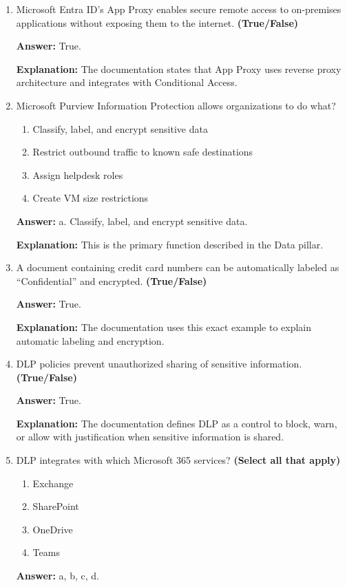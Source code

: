 \documentclass[10pt]{article}
\begin{document}
\begin{enumerate}[leftmargin=*]
\textbf{Explanation:} The Applications section explicitly identifies Defender for Cloud Apps as the tool for shadow IT visibility and control.

\item Microsoft Entra ID’s App Proxy enables secure remote access to on-premises applications without exposing them to the internet. \textbf{(True/False)}

\textbf{Answer:} True.

\textbf{Explanation:} The documentation states that App Proxy uses reverse proxy architecture and integrates with Conditional Access.

\item Microsoft Purview Information Protection allows organizations to do what?
\begin{enumerate}[label=\alph*., leftmargin=1.5em]
\item Classify, label, and encrypt sensitive data
\item Restrict outbound traffic to known safe destinations
\item Assign helpdesk roles
\item Create VM size restrictions
\end{enumerate}
\textbf{Answer:} a. Classify, label, and encrypt sensitive data.

\textbf{Explanation:} This is the primary function described in the Data pillar.

\item A document containing credit card numbers can be automatically labeled as ``Confidential'' and encrypted. \textbf{(True/False)}

\textbf{Answer:} True.

\textbf{Explanation:} The documentation uses this exact example to explain automatic labeling and encryption.

\item DLP policies prevent unauthorized sharing of sensitive information. \textbf{(True/False)}

\textbf{Answer:} True.

\textbf{Explanation:} The documentation defines DLP as a control to block, warn, or allow with justification when sensitive information is shared.

\item DLP integrates with which Microsoft 365 services? \textbf{(Select all that apply)}
\begin{enumerate}[label=\alph*., leftmargin=1.5em]
\item Exchange
\item SharePoint
\item OneDrive
\item Teams
\end{enumerate}
\textbf{Answer:} a, b, c, d.


\end{enumerate}
\end{document}
